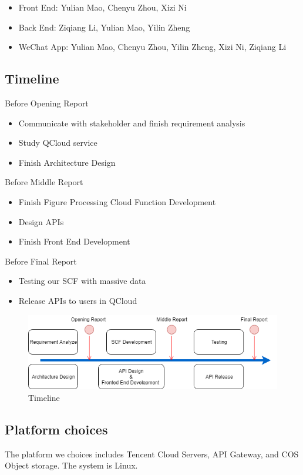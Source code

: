 \documentclass[a4paper,12pt]{article}
\begin{document}
\begin{itemize}
	\item Front End: Yulian Mao, Chenyu Zhou, Xizi Ni
	\item Back End: Ziqiang Li, Yulian Mao, Yilin Zheng
	\item WeChat App: Yulian Mao, Chenyu Zhou, Yilin Zheng, Xizi Ni, Ziqiang Li
\end{itemize}

\subsection{Timeline}
Before Opening Report
\begin{itemize}
	\item Communicate with stakeholder and finish requirement analysis
	\item Study QCloud service
	\item Finish Architecture Design
\end{itemize}
Before Middle Report
\begin{itemize}
	\item Finish Figure Processing Cloud Function Development
	\item Design APIs
	\item Finish Front End Development
\end{itemize}
Before Final Report
\begin{itemize}
	\item Testing our SCF with massive data
	\item Release APIs to users in QCloud
\end{itemize}

\begin{figure}[H]
\includegraphics[scale=0.6]{figures/Timeline.png}
\caption{Timeline}
\end{figure}

\subsection{Platform choices}
	The platform we choices includes Tencent Cloud Servers, API Gateway, and COS Object storage. The system is Linux.
\end{document}
